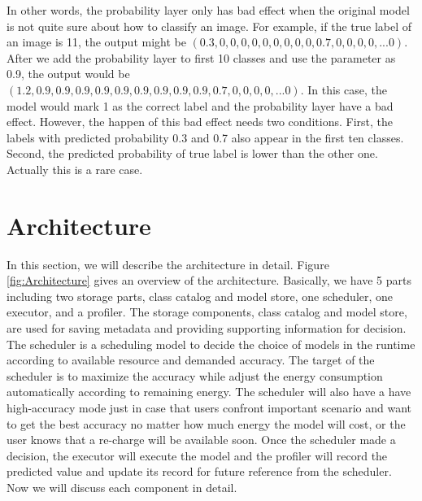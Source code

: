 \documentclass[conference]{IEEEtran}
\begin{document}
\begin{spacing}{0.9}
In other words, the probability layer only has bad effect when the original model is not quite sure about how to classify an image. For example, if the true label of an image is 11, the output might be $(0.3, 0, 0, 0, 0, 0, 0, 0, 0, 0, 0.7, 0, 0, 0, 0, ... 0)$. After we add the probability layer to first 10 classes and use the parameter as 0.9, the output would be $(1.2, 0.9, 0.9, 0.9, 0.9, 0.9, 0.9, 0.9, 0.9, 0.9, 0.7, 0, 0, 0, 0, ... 0)$. In this case, the model would mark 1 as the correct label and the probability layer have a bad effect. However, the happen of this bad effect needs two conditions. First, the labels with predicted probability 0.3 and 0.7 also appear in the first ten classes. Second, the predicted probability of true label is lower than the other one. Actually this is a rare case.


\section{Architecture}
In this section, we will describe the architecture in detail. Figure \ref{fig:Architecture} gives an overview of the architecture. Basically, we have 5 parts including two storage parts, class catalog and model store, one scheduler, one executor, and a profiler. The storage components, class catalog and model store, are used for saving metadata and providing supporting information for decision. The scheduler is a scheduling model to decide the choice of models in the runtime according to available resource and demanded accuracy. The target of the scheduler is to maximize the accuracy while adjust the energy consumption automatically according to remaining energy. The scheduler will also have a have high-accuracy mode just in case that users confront important scenario and want to get the best accuracy no matter how much energy the model will cost, or the user knows that a re-charge will be available soon. Once the scheduler made a decision, the executor will execute the model and the profiler will record the predicted value and update its record for future reference from the scheduler. Now we will discuss each component in detail.


\end{spacing}
\end{document}
